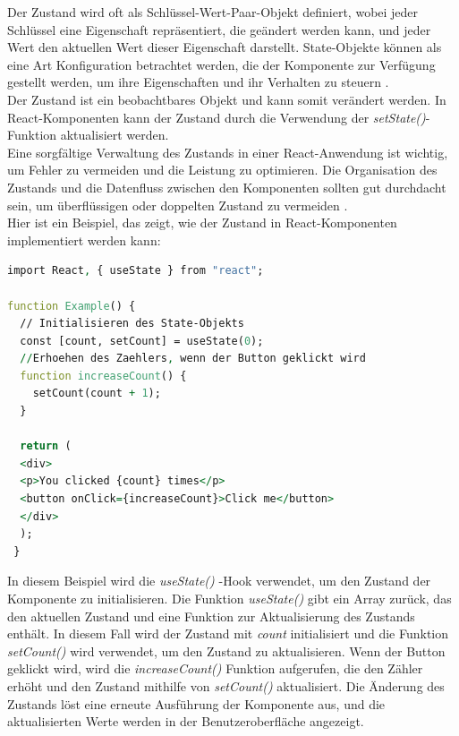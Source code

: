 Der Zustand wird oft als Schlüssel-Wert-Paar-Objekt definiert, wobei jeder Schlüssel eine Eigenschaft repräsentiert, die geändert werden kann, und jeder Wert den aktuellen Wert dieser Eigenschaft darstellt. State-Objekte können als eine Art Konfiguration betrachtet werden, die der Komponente zur Verfügung gestellt werden, um ihre Eigenschaften und ihr Verhalten zu steuern \cite{FreeCodeCampStateInReact}.\\
Der Zustand ist ein beobachtbares Objekt und kann somit verändert werden. In React-Komponenten kann der Zustand durch die Verwendung der \emph{setState()}-Funktion aktualisiert werden.\\
Eine sorgfältige Verwaltung des Zustands in einer React-Anwendung ist wichtig, um Fehler zu vermeiden und die Leistung zu optimieren. Die Organisation des Zustands und die Datenfluss zwischen den Komponenten sollten gut durchdacht sein, um überflüssigen oder doppelten Zustand zu vermeiden \cite{ReactManagingState}.\\
Hier ist ein Beispiel, das zeigt, wie der Zustand in React-Komponenten implementiert werden kann:

\begin{lstlisting}[language=vhdl,
	frame=single,           % Ein Rahmen um den Code
	framexleftmargin=15pt,  % Rahmen link von den Zahlen
	style=algoBericht,
	label={State-Fkt.},
	captionpos=b ,          % Caption unter den Code setzen
	caption={Beispiel State in Reeact}]
import React, { useState } from "react";
	
function Example() {
  // Initialisieren des State-Objekts
  const [count, setCount] = useState(0);
  //Erhoehen des Zaehlers, wenn der Button geklickt wird
  function increaseCount() {
    setCount(count + 1);
  }
	
  return (
  <div>
  <p>You clicked {count} times</p>
  <button onClick={increaseCount}>Click me</button>
  </div>
  );
 }
\end{lstlisting}

In diesem Beispiel wird die \emph{useState()} -Hook verwendet, um den Zustand der Komponente zu initialisieren. Die Funktion \emph{useState()} gibt ein Array zurück, das den aktuellen Zustand und eine Funktion zur Aktualisierung des Zustands enthält. In diesem Fall wird der Zustand mit \emph{count} initialisiert und die Funktion \emph{setCount()} wird verwendet, um den Zustand zu aktualisieren. Wenn der Button geklickt wird, wird die \emph{increaseCount()} Funktion aufgerufen, die den Zähler erhöht und den Zustand mithilfe von \emph{setCount()} aktualisiert. Die Änderung des Zustands löst eine erneute Ausführung der Komponente aus, und die aktualisierten Werte werden in der Benutzeroberfläche angezeigt.


